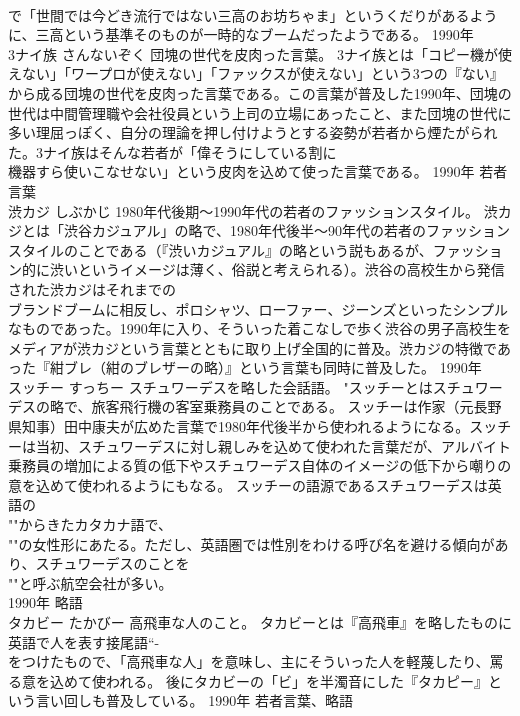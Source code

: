 \documentclass[8pt]{extreport}
\begin{document}
\begin{CJK}{UTF8}{min}
\\	で「世間では今どき流行ではない三高のお坊ちゃま」というくだりがあるように、三高という基準そのものが一時的なブームだったようである。	1990年	
\\	3ナイ族	さんないぞく	団塊の世代を皮肉った言葉。	3ナイ族とは「コピー機が使えない」「ワープロが使えない」「ファックスが使えない」という3つの『ない』から成る団塊の世代を皮肉った言葉である。この言葉が普及した1990年、団塊の世代は中間管理職や会社役員という上司の立場にあったこと、また団塊の世代に多い理屈っぽく、自分の理論を押し付けようとする姿勢が若者から煙たがられた。3ナイ族はそんな若者が「偉そうにしている割に
\\	機器すら使いこなせない」という皮肉を込めて使った言葉である。	1990年	若者言葉	
\\	渋カジ	しぶかじ	1980年代後期～1990年代の若者のファッションスタイル。	渋カジとは「渋谷カジュアル」の略で、1980年代後半～90年代の若者のファッションスタイルのことである（『渋いカジュアル』の略という説もあるが、ファッション的に渋いというイメージは薄く、俗説と考えられる）。渋谷の高校生から発信された渋カジはそれまでの
\\	ブランドブームに相反し、ポロシャツ、ローファー、ジーンズといったシンプルなものであった。1990年に入り、そういった着こなしで歩く渋谷の男子高校生をメディアが渋カジという言葉とともに取り上げ全国的に普及。渋カジの特徴であった『紺ブレ（紺のブレザーの略）』という言葉も同時に普及した。	1990年	
\\	スッチー	すっちー	スチュワーデスを略した会話語。	"スッチーとはスチュワーデスの略で、旅客飛行機の客室乗務員のことである。 スッチーは作家（元長野県知事）田中康夫が広めた言葉で1980年代後半から使われるようになる。スッチーは当初、スチュワーデスに対し親しみを込めて使われた言葉だが、アルバイト乗務員の増加による質の低下やスチュワーデス自体のイメージの低下から嘲りの意を込めて使われるようにもなる。 スッチーの語源であるスチュワーデスは英語の
\\	""からきたカタカナ語で、
\\	""の女性形にあたる。ただし、英語圏では性別をわける呼び名を避ける傾向があり、スチュワーデスのことを
\\	""と呼ぶ航空会社が多い。
\\	1990年	略語	
\\	タカビー	たかびー	高飛車な人のこと。	タカビーとは『高飛車』を略したものに英語で人を表す接尾語“-
\\	をつけたもので、「高飛車な人」を意味し、主にそういった人を軽蔑したり、罵る意を込めて使われる。 後にタカビーの「ビ」を半濁音にした『タカピー』という言い回しも普及している。	1990年	若者言葉、略語	

\end{CJK}
\end{document}
